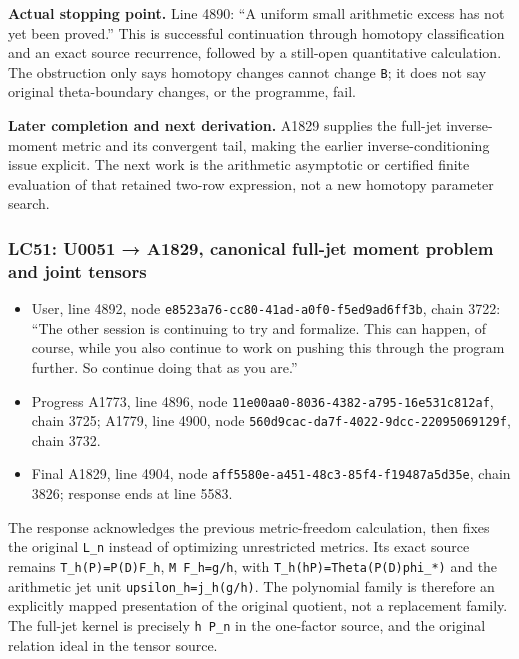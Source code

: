 \textbf{Actual stopping point.} Line 4890: ``A uniform small arithmetic
excess has not yet been proved.'' This is successful continuation
through homotopy classification and an exact source recurrence, followed
by a still-open quantitative calculation. The obstruction only says
homotopy changes cannot change \texttt{B}; it does not say original
theta-boundary changes, or the programme, fail.

\textbf{Later completion and next derivation.} A1829 supplies the
full-jet inverse-moment metric and its convergent tail, making the
earlier inverse-conditioning issue explicit. The next work is the
arithmetic asymptotic or certified finite evaluation of that retained
two-row expression, not a new homotopy parameter search.

\subsubsection{LC51: U0051 → A1829, canonical full-jet moment problem
and joint
tensors}\label{lc51-u0051-a1829-canonical-full-jet-moment-problem-and-joint-tensors}

\begin{itemize}
\tightlist
\item
  User, line 4892, node \texttt{e8523a76-cc80-41ad-a0f0-f5ed9ad6ff3b},
  chain 3722: ``The other session is continuing to try and formalize.
  This can happen, of course, while you also continue to work on pushing
  this through the program further. So continue doing that as you are.''
\item
  Progress A1773, line 4896, node
  \texttt{11e00aa0-8036-4382-a795-16e531c812af}, chain 3725; A1779, line
  4900, node \texttt{560d9cac-da7f-4022-9dcc-22095069129f}, chain 3732.
\item
  Final A1829, line 4904, node
  \texttt{aff5580e-a451-48c3-85f4-f19487a5d35e}, chain 3826; response
  ends at line 5583.
\end{itemize}

The response acknowledges the previous metric-freedom calculation, then
fixes the original \texttt{L\_n} instead of optimizing unrestricted
metrics. Its exact source remains \texttt{T\_h(P)=P(D)F\_h},
\texttt{M\ F\_h=g/h}, with \texttt{T\_h(hP)=Theta(P(D)phi\_*)} and the
arithmetic jet unit \texttt{upsilon\_h=j\_h(g/h)}. The polynomial family
is therefore an explicitly mapped presentation of the original quotient,
not a replacement family. The full-jet kernel is precisely
\texttt{h\ P\_n} in the one-factor source, and the original relation
ideal in the tensor source.

